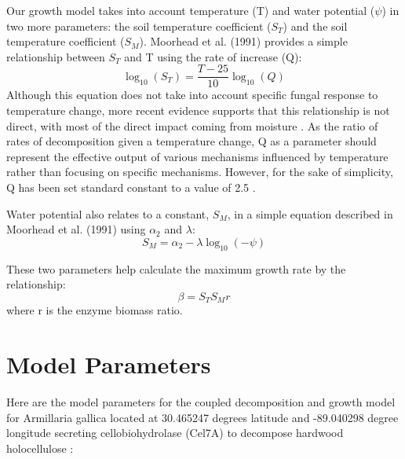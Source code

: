 \documentclass{article}
\begin{document}
Our growth model takes into account temperature (T) and water potential ($\psi$) in two more parameters: the soil temperature coefficient ($S_T$) and the soil temperature coefficient ($S_M$). Moorhead et al. (1991) provides a simple relationship between $S_T$ and T using the rate of increase (Q):
\begin{equation}
\log_{10}(S_T) = \frac{T-25}{10}\log_{10}(Q)
\end{equation}
Although this equation does not take into account specific fungal response to temperature change, more recent evidence supports that this relationship is not direct, with most of the direct impact coming from moisture \cite{Petraglia2018}. As the ratio of rates of decomposition given a temperature change, Q as a parameter should represent the effective output of various mechanisms influenced by temperature rather than focusing on specific mechanisms. However, for the sake of simplicity, Q has been set standard constant to a value of 2.5 \cite{Moorhead1991}.

Water potential also relates to a constant, $S_M$, in a simple equation described in Moorhead et al. (1991) using $\alpha_2$ and $\lambda$:
\begin{equation}
S_M = \alpha_2 -\lambda \log_{10}(-\psi)
\end{equation}

These two parameters help calculate the maximum growth rate by the relationship:
\begin{equation}
\beta = S_T S_M r
\end{equation}
where r is the enzyme biomass ratio.



\newpage
\section{Model Parameters}

Here are the model parameters for the coupled decomposition and growth model for Armillaria gallica located at 30.465247 degrees latitude and -89.040298 degree longitude secreting cellobiohydrolase (Cel7A) to decompose hardwood holocellulose \cite{Maynard2019} \cite{Kari2014}:
\end{document}
